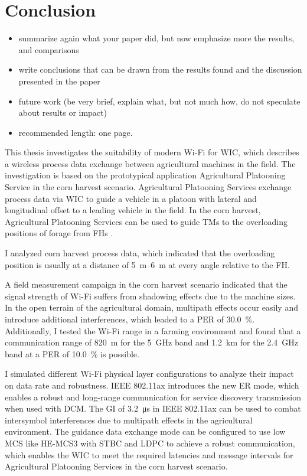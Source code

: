 \chapter{Conclusion}
\acresetall

\begin{itemize}
\item summarize again what your paper did, but now emphasize more the results, and comparisons
\item write conclusions that can be drawn from the results found and the discussion presented in the paper
\item future work (be very brief, explain what, but not much how, do not speculate about results or impact)
\item recommended length: one page.
\end{itemize}
This thesis investigates the suitability of modern Wi-Fi for \ac{WIC}, which describes a wireless process data exchange between agricultural machines in the field.
The investigation is based on the prototypical application Agricultural Platooning Service in the corn harvest scenario.
Agricultural Platooning Services exchange process data via \ac{WIC} to guide a vehicle in a platoon with lateral and longitudinal
offset to a leading vehicle in the field.
In the corn harvest, Agricultural Platooning Services can be used to guide \ac{TM}s to the overloading positions of forage from \ac{FH}s .

I analyzed corn harvest process data, which indicated that the overloading position is usually at a distance of \SIrange{5}{6}{\meter} at every angle relative to the \ac{FH}.

A field measurement campaign in the corn harvest scenario indicated that the signal strength of Wi-Fi suffers from shadowing effects due to the machine sizes.
In the open terrain of the agricultural domain, multipath effects occur easily and introduce additional interferences, which leaded to a \ac{PER} of \SI{30.0}{\percent}.
Additionally, I tested the Wi-Fi range in a farming environment and found that a communication range of \SI{820}{\meter}
for the \SI{5}{\giga\hertz} band and \SI{1.2}{\kilo\meter} for the \SI{2.4}{\giga\hertz} band
at a \ac{PER} of \SI{10.0}{\percent} is possible. 

I simulated different Wi-Fi physical layer configurations to analyze their impact on data rate and robustness.
IEEE 802.11ax introduces the new \ac{ER} mode, which enables a robust and long-range communication for service discovery transmission when used with \ac{DCM}.
The \ac{GI} of \SI{3.2}{\micro\second} in IEEE 802.11ax can be used to combat intersymbol interferences due to multipath effects in the agricultural environment.
The guidance data exchange mode can be configured to use low \ac{MCS} like \ac{HE}-\ac{MCS}3 with \ac{STBC} and \ac{LDPC} to achieve a robust communication,
which enables the \ac{WIC} to meet the required latencies and message intervals for Agricultural Platooning Services in the corn harvest scenario.

